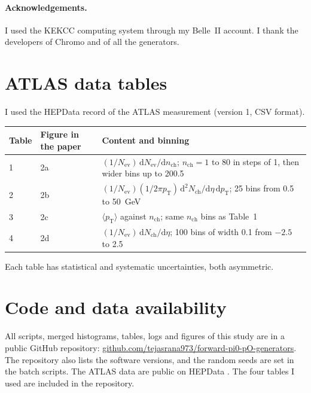\documentclass[11pt,a4paper]{article}
\newcommand{\pT}{\ensuremath{p_{\mathrm{T}}}}
\newcommand{\nch}{\ensuremath{n_{\mathrm{ch}}}}
\newcommand{\dd}{\mathrm{d}}
\begin{document}
\paragraph{Acknowledgements.}
I used the KEKCC computing system through my Belle~II account.
I thank the developers of Chromo and of all the generators.

\appendix
\section{ATLAS data tables}
\label{app:hepdata}
I used the HEPData record of the ATLAS measurement \cite{ATLAS:hepdata} (version 1, CSV format).
\begin{center}
\small
\begin{tabular}{@{}llp{7.2cm}@{}}
\toprule
Table & Figure in the paper & Content and binning\\
\midrule
1 & 2a & $(1/N_{\mathrm{ev}})\,\dd N_{\mathrm{ev}}/\dd\nch$; $\nch=1$ to 80 in steps of 1, then wider bins up to 200.5\\
2 & 2b & $(1/N_{\mathrm{ev}})(1/2\pi\pT)\,\dd^{2}N_{\mathrm{ch}}/\dd\eta\,\dd\pT$; 25 bins from 0.5 to 50~GeV\\
3 & 2c & $\langle\pT\rangle$ against $\nch$; same $\nch$ bins as Table~1\\
4 & 2d & $(1/N_{\mathrm{ev}})\,\dd N_{\mathrm{ch}}/\dd\eta$; 100 bins of width 0.1 from $-2.5$ to 2.5\\
\bottomrule
\end{tabular}
\end{center}
Each table has statistical and systematic uncertainties, both asymmetric.

\section*{Code and data availability}
All scripts, merged histograms, tables, logs and figures of this study are in a public GitHub repository: \href{https://github.com/tejasrana973/forward-pi0-pO-generators}{github.com/tejasrana973/forward-pi0-pO-generators}.
The repository also lists the software versions, and the random seeds are set in the batch scripts.
The ATLAS data are public on HEPData \cite{ATLAS:hepdata}.
The four tables I used are included in the repository.

{\small

}
\end{document}
